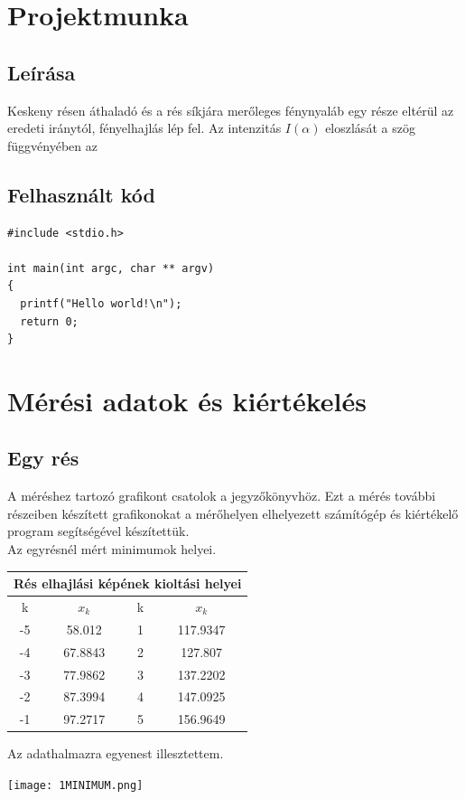 \documentclass[a4paper,11pt]{article}
\begin{document}
\section{Projektmunka}

\subsection{Leírása}

\indent Keskeny résen áthaladó és a rés síkjára merőleges fénynyaláb egy része eltérül az eredeti iránytól, fényelhajlás lép fel. Az intenzitás $I(\alpha)$ eloszlását a szög függvényében az


\subsection{Felhasznált kód}

\begin{lstlisting}
#include <stdio.h>

int main(int argc, char ** argv)
{
  printf("Hello world!\n");
  return 0;
}
\end{lstlisting} 

\section{Mérési adatok és kiértékelés}

\subsection{Egy rés}

A méréshez tartozó grafikont csatolok a jegyzőkönyvhöz. Ezt a mérés további részeiben készített grafikonokat a mérőhelyen elhelyezett számítógép és kiértékelő program segítségével készítettük. \\
Az egyrésnél mért minimumok helyei.
\begin{center}
\begin{tabular}{|c|c|c|c|} \hline
\multicolumn{4}{|c|}{Rés elhajlási képének kioltási helyei} \\ \hline
k & $x_k$ & k & $x_k$ \\ \hline
-5 & 58.012 & 1 & 117.9347 \\ \hline
-4 & 67.8843 & 2 & 127.807 \\ \hline
-3 & 77.9862 & 3 & 137.2202 \\ \hline
-2 & 87.3994 & 4 & 147.0925 \\ \hline
-1 & 97.2717 & 5 & 156.9649 \\ \hline
\end{tabular}
\end{center}
Az adathalmazra egyenest illesztettem.
\begin{center}
\texttt{[image: 1MINIMUM.png]}
\end{center}
\end{document}
